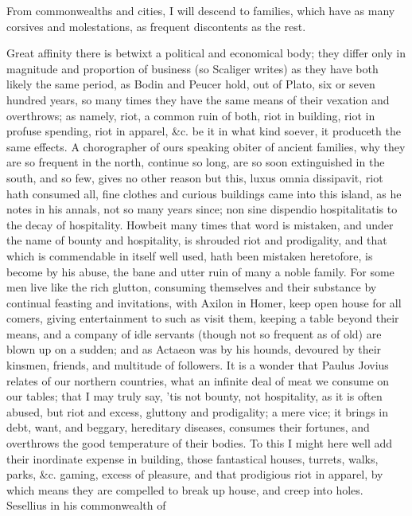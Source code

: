 {From commonwealths and cities, I will descend to families, which have
as many corsives and molestations, as frequent discontents as the rest.

Great affinity there is betwixt a political and economical body; they
differ only in magnitude and proportion of business (so Scaliger
writes) as they have both likely the same period, as Bodin
and Peucer hold, out of Plato, six or seven hundred years, so many
times they have the same means of their vexation and overthrows; as
namely, riot, a common ruin of both, riot in building, riot in profuse
spending, riot in apparel, \&c. be it in what kind soever, it produceth
the same effects. A chorographer of ours speaking obiter of
ancient families, why they are so frequent in the north, continue so
long, are so soon extinguished in the south, and so few, gives no other
reason but this, luxus omnia dissipavit, riot hath consumed all, fine
clothes and curious buildings came into this island, as he notes in his
annals, not so many years since; non sine dispendio hospitalitatis to
the decay of hospitality. Howbeit many times that word is mistaken, and
under the name of bounty and hospitality, is shrouded riot and
prodigality, and that which is commendable in itself well used, hath
been mistaken heretofore, is become by his abuse, the bane and utter
ruin of many a noble family. For some men live like the rich glutton,
consuming themselves and their substance by continual feasting and
invitations, with Axilon in Homer, keep open house for all comers,
giving entertainment to such as visit them, keeping a table beyond
their means, and a company of idle servants (though not so frequent as
of old) are blown up on a sudden; and as Actaeon was by his hounds,
devoured by their kinsmen, friends, and multitude of followers. It
is a wonder that Paulus Jovius relates of our northern countries, what
an infinite deal of meat we consume on our tables; that I may truly
say, 'tis not bounty, not hospitality, as it is often abused, but riot
and excess, gluttony and prodigality; a mere vice; it brings in debt,
want, and beggary, hereditary diseases, consumes their fortunes, and
overthrows the good temperature of their bodies. To this I might here
well add their inordinate expense in building, those fantastical
houses, turrets, walks, parks, \&c. gaming, excess of pleasure, and that
prodigious riot in apparel, by which means they are compelled to break
up house, and creep into holes. Sesellius in his commonwealth of
}
